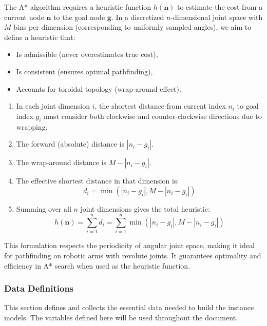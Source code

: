 \documentclass[12pt]{article}
\begin{document}
The A* algorithm requires a heuristic function $h(\mathbf{n})$ to estimate the cost from a current node $\mathbf{n}$ to the goal node $\mathbf{g}$. In a discretized $n$-dimensional joint space with $M$ bins per dimension (corresponding to uniformly sampled angles), we aim to define a heuristic that:

\begin{itemize}
    \item Is admissible (never overestimates true cost),
    \item Is consistent (ensures optimal pathfinding),
    \item Accounts for toroidal topology (wrap-around effect).
\end{itemize}

\begin{enumerate}
    \item In each joint dimension $i$, the shortest distance from current index $n_i$ to goal index $g_i$ must consider both clockwise and counter-clockwise directions due to wrapping. 
    \item The forward (absolute) distance is $|n_i - g_i|$.
    \item The wrap-around distance is $M - |n_i - g_i|$.
    \item The effective shortest distance in that dimension is:
    \[
    d_i = \min(|n_i - g_i|, M - |n_i - g_i|)
    \]
    \item Summing over all $n$ joint dimensions gives the total heuristic:
    \[
    h(\mathbf{n}) = \sum_{i=1}^{n} d_i = \sum_{i=1}^{n} \min(|n_i - g_i|, M - |n_i - g_i|)
    \]
\end{enumerate}

This formulation respects the periodicity of angular joint space, making it ideal for pathfinding on robotic arms with revolute joints. It guarantees optimality and efficiency in A* search when used as the heuristic function.




\subsubsection{Data Definitions}\label{sec_datadef}

This section defines and collects the essential data needed to build the instance models. The variables defined here will be used throughout the document.
\end{document}
